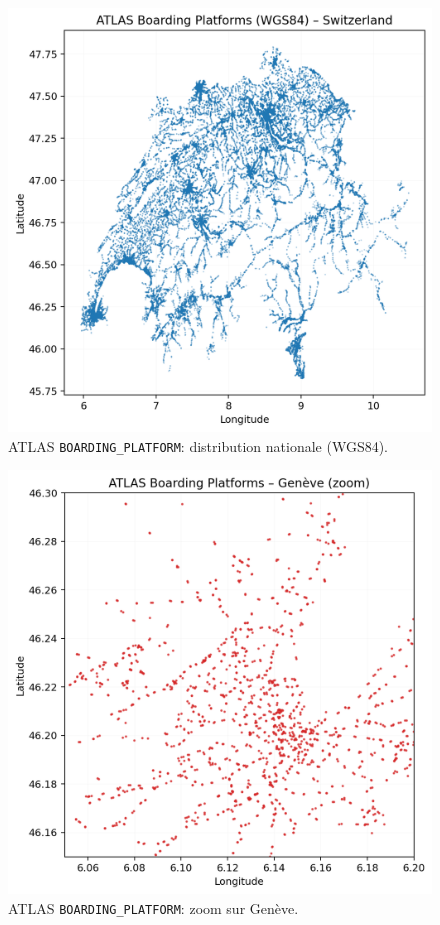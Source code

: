 \begin{figure}[h]
  \centering
  \includegraphics[width=.76\linewidth]{figures/plots/atlas_points_switzerland.png}
  \caption[ATLAS BOARDING\_PLATFORM: distribution nationale]{ATLAS \texttt{BOARDING\_PLATFORM}: distribution nationale (WGS84).}
  \label{fig:atlas_ch_points}
\end{figure}

\begin{figure}[h]
  \centering
  \includegraphics[width=.6\linewidth]{figures/plots/atlas_points_geneva.png}
  \caption[ATLAS BOARDING\_PLATFORM: Genève]{ATLAS \texttt{BOARDING\_PLATFORM}: zoom sur Genève.}
  \label{fig:atlas_geneva}
\end{figure}

